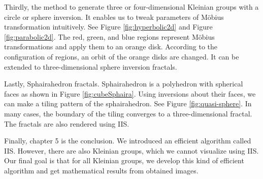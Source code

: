 \documentclass[uplatex, dvipdfmx]{article}
\begin{document}
Thirdly, the method to generate three or four-dimensional Kleinian groups with
a circle or sphere inversion. It enables us to tweak parameters of M\"obius
transformation intuitively.
See Figure \ref{fig:hyperbolic2d} and Figure \ref{fig:parabolic2d}.
The red, green, and blue regions represent M\"obius transformations and
apply them to an orange disk.
According to the configuration of regions, an orbit of the orange disks are
changed.
It can be extended to three-dimensional sphere inversion fractals.

Lastly, Sphairahedron fractals. Sphairahedron is a polyhedron with spherical
faces as shown in Figure \ref{fig:cubeSphaira}.
Using inversions about their faces, we can make a tiling pattern
of the sphairahedron. See Figure \ref{fig:quasi-sphere}.
In many cases, the boundary of the tiling converges to a
three-dimensional fractal. 
The fractals are also rendered using IIS.

Finally, chapter 5 is the conclusion. We introduced an efficient algorithm
called IIS.
However, there are also Kleinian groups, which we cannot
visualize using IIS.
Our final goal is that for all Kleinian groups, we develop this kind of
efficient algorithm and get mathematical results from obtained images.
\end{document}
